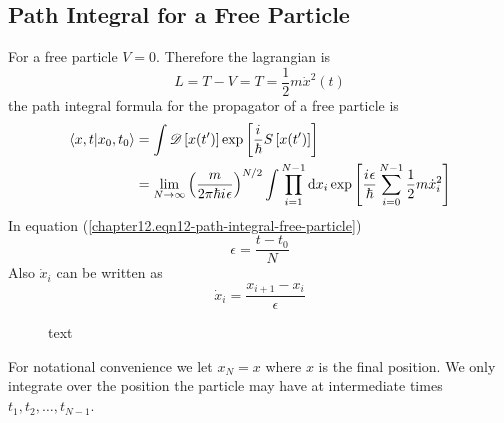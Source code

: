 \begin{enumerate}
	\section{Path Integral for a Free Particle}
	For a free particle $V=0$. Therefore the lagrangian is
	\begin{equation}
		L = T - V = T = \frac{1}{2} m \dot{x}^2(t)
		\label{chapter12.eqn11-path-integral-free-particle}
	\end{equation}
	the path integral formula for the propagator of a free particle is
	\begin{align}
		\braket{x, t}{x_0, t_0} 
		&= \int \mathcal{D}\left[x(t^\prime)\right] \exp\left[\frac{{i\mkern1mu}}{\hbar} S\left[x(t^\prime)\right]\right] \\
		&= \lim\limits_{N \rightarrow \infty} \left(\frac{m}{2 \pi \hbar {i\mkern1mu} \epsilon}\right)^{N/2} \int \prod_{i=1}^{N-1} \dd{x_i} \exp\left[\frac{{i\mkern1mu} \epsilon}{\hbar} \sum_{i=0}^{N-1} \frac{1}{2} m \dot{x}_i^2\right]
		\label{chapter12.eqn12-path-integral-free-particle}
	\end{align}
	In equation (\ref{chapter12.eqn12-path-integral-free-particle})
	\begin{equation}
		\epsilon = \frac{t - t_0}{N}
	\end{equation}
	Also $\dot{x}_i$ can be written as
	\begin{equation}
		\dot{x}_i = \frac{x_{i+1} - x_i}{\epsilon}
		\label{chapter12.eqn13-path-integral-free-particle}
	\end{equation}
	
	\begin{figure}
		\centering
		\caption{text}
		\label{chapter12.fig2}
	\end{figure}
	For notational convenience we let $x_N = x$ where $x$ is the final position. We only integrate over the position the particle may have at intermediate times $t_1, t_2, \ldots, t_{N-1}$.\\
	

\end{enumerate}
